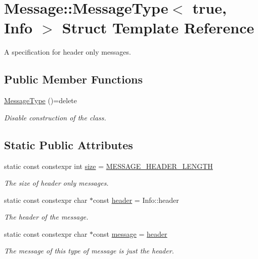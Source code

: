 \hypertarget{struct_message_1_1_message_type_3_01true_00_01_info_01_4}{}\section{Message\+:\+:Message\+Type$<$ true, Info $>$ Struct Template Reference}
\label{struct_message_1_1_message_type_3_01true_00_01_info_01_4}


A specification for header only messages.  


\subsection*{Public Member Functions}
\begin{DoxyCompactItemize}
\item 
\hyperlink{struct_message_1_1_message_type_3_01true_00_01_info_01_4_adaa3100a1ea2b1f782911d5c328ed4bb}{Message\+Type} ()=delete
\begin{DoxyCompactList}\small\item\em Disable construction of the class. \end{DoxyCompactList}\end{DoxyCompactItemize}
\subsection*{Static Public Attributes}
\begin{DoxyCompactItemize}
\item 
static const constexpr int \hyperlink{struct_message_1_1_message_type_3_01true_00_01_info_01_4_a2cc4f5dbfaba4502c6209e73836c96f1}{size} = \hyperlink{message_8hpp_ac119f42bacd57152815371e9527d1059}{M\+E\+S\+S\+A\+G\+E\+\_\+\+H\+E\+A\+D\+E\+R\+\_\+\+L\+E\+N\+G\+TH}
\begin{DoxyCompactList}\small\item\em The size of header only messages. \end{DoxyCompactList}\item 
static const constexpr char $\ast$const \hyperlink{struct_message_1_1_message_type_3_01true_00_01_info_01_4_a1518832727d6d5e69c44f12f88a70783}{header} = Info\+::header
\begin{DoxyCompactList}\small\item\em The header of the message. \end{DoxyCompactList}\item 
static const constexpr char $\ast$const \hyperlink{struct_message_1_1_message_type_3_01true_00_01_info_01_4_a7da3fc36e70029f1aab4b702dc88f764}{message} = \hyperlink{struct_message_1_1_message_type_3_01true_00_01_info_01_4_a1518832727d6d5e69c44f12f88a70783}{header}
\begin{DoxyCompactList}\small\item\em The message of this type of message is just the header. \end{DoxyCompactList}\end{DoxyCompactItemize}


